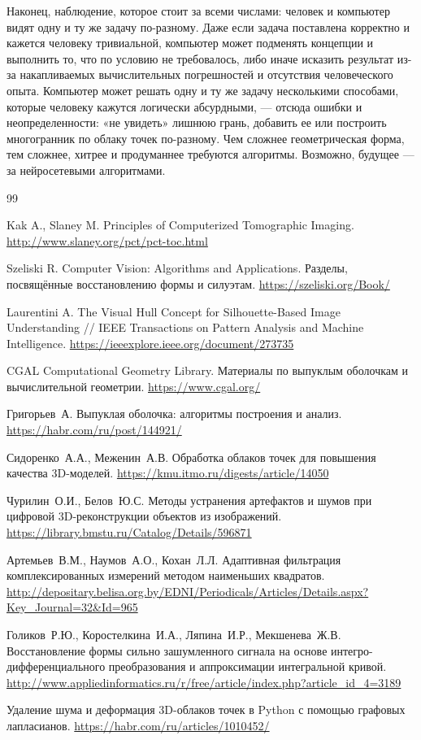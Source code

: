 \documentclass[12pt, a4paper]{article}
\begin{document}
Наконец, наблюдение, которое стоит за всеми числами: человек и компьютер видят одну и ту же задачу по-разному. Даже если задача поставлена корректно и кажется человеку тривиальной, компьютер может подменять концепции и выполнить то, что по условию не требовалось, либо иначе исказить результат из-за накапливаемых вычислительных погрешностей и отсутствия человеческого опыта. Компьютер может решать одну и ту же задачу несколькими способами, которые человеку кажутся логически абсурдными, --- отсюда ошибки и неопределенности: «не увидеть» лишнюю грань, добавить ее или построить многогранник по облаку точек по-разному. Чем сложнее геометрическая форма, тем сложнее, хитрее и продуманнее требуются алгоритмы. Возможно, будущее --- за нейросетевыми алгоритмами.

\clearpage
{}
\renewcommand{\refname}{Список литературы}
\begin{thebibliography}{99}\sloppy

Kak A., Slaney M.
Principles of Computerized Tomographic Imaging.
\url{http://www.slaney.org/pct/pct-toc.html}

Szeliski R.
Computer Vision: Algorithms and Applications.
Разделы, посвящённые восстановлению формы и силуэтам.
\url{https://szeliski.org/Book/}

Laurentini A.
The Visual Hull Concept for Silhouette-Based Image Understanding //
IEEE Transactions on Pattern Analysis and Machine Intelligence.
\url{https://ieeexplore.ieee.org/document/273735}

CGAL Computational Geometry Library.
Материалы по выпуклым оболочкам и вычислительной геометрии.
\url{https://www.cgal.org/}

Григорьев~А.
Выпуклая оболочка: алгоритмы построения и анализ.
\url{https://habr.com/ru/post/144921/}

Сидоренко~А.А., Меженин~А.В.
Обработка облаков точек для повышения качества 3D-моделей.
\url{https://kmu.itmo.ru/digests/article/14050}

Чурилин~О.И., Белов~Ю.С.
Методы устранения артефактов и шумов при цифровой 3D-реконструкции объектов из изображений.
\url{https://library.bmstu.ru/Catalog/Details/596871}

Артемьев~В.М., Наумов~А.О., Кохан~Л.Л.
Адаптивная фильтрация комплексированных измерений методом наименьших квадратов.
\url{http://depositary.belisa.org.by/EDNI/Periodicals/Articles/Details.aspx?Key_Journal=32&Id=965}

Голиков~Р.Ю., Коростелкина~И.А., Ляпина~И.Р., Мекшенева~Ж.В.
Восстановление формы сильно зашумленного сигнала на основе интегро-дифференциального преобразования и аппроксимации интегральной кривой.
\url{http://www.appliedinformatics.ru/r/free/article/index.php?article_id_4=3189}

Удаление шума и деформация 3D-облаков точек в Python с помощью графовых лапласианов.
\url{https://habr.com/ru/articles/1010452/}

\end{thebibliography}
\end{document}
